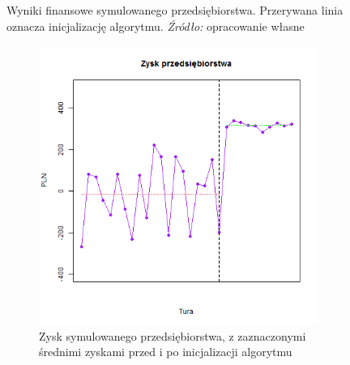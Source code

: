 \documentclass[polish, twoside, 12pt, a4paper]{article}
\theoremstyle{definition}
\theoremstyle{plain}
\theoremstyle{remark}
\begin{document}
\begin{figure}[hbt]
  \captionsetup{margin=10pt,font=small,labelfont=bf,width=.8\textwidth}

  \caption[Wyniki finansowe symulowanego przedsiębiorstwa]{Wyniki finansowe symulowanego przedsiębiorstwa. Przerywana linia oznacza inicjalizację algorytmu. \textit{Źródło:} opracowanie własne}\label{fig:wynikifin}
\end{figure}

\begin{figure}[hbt]
  \centering
  \begin{subfigure}[t]{0.45\textwidth}
    \includegraphics[width=\textwidth]{pictures/zysk_lm.png}
    \caption{Zysk symulowanego przedsiębiorstwa, z zaznaczonymi średnimi zyskami przed i po inicjalizacji algorytmu}
    \label{fig:przychod_koszt}
  \end{subfigure}
  \hfill
  \begin{subfigure}[t]{0.45\textwidth}


\end{subfigure}
\end{figure}
\end{document}
